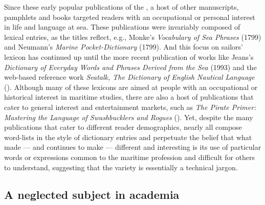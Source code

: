 Since these early popular publications of the , a host of other manuscripts, pamphlets and books targeted readers with an occupational or personal interest in life and language at sea. These publications were invariably composed of lexical entries, as the titles reflect, e.g., Monke’s \textit{Vocabulary of Sea Phrases} (1799) and Neumann’s \textit{Marine Pocket-Dictionary} (1799). And this focus on sailors’ lexicon has continued up until the more recent publication of works like Jeans’s \textit{Dictionary of Everyday Words and Phrases Derived from the Sea} (1993) and the web-based reference work \textit{Seatalk, The Dictionary of English Nautical Language} (\citealt{MacKenzie2005}). Although many of these lexicons are aimed at people with an occupational or historical interest in maritime studies, there are also a host of publications that cater to general interest and entertainment markets, such as \textit{The Pirate Primer: Mastering the Language of Swashbucklers and Rogues} (\citealt{Choundas2007}). Yet, despite the many publications that cater to different reader demographics, nearly all compose word-lists in the style of dictionary entries and perpetuate the belief that what made — and continues to make —  different and interesting is its use of particular words or expressions common to the maritime profession and difficult for others to understand, suggesting that the variety is essentially a technical jargon. 



\subsection{{A neglected subject in academia}}\label{sec:1.1.3}



